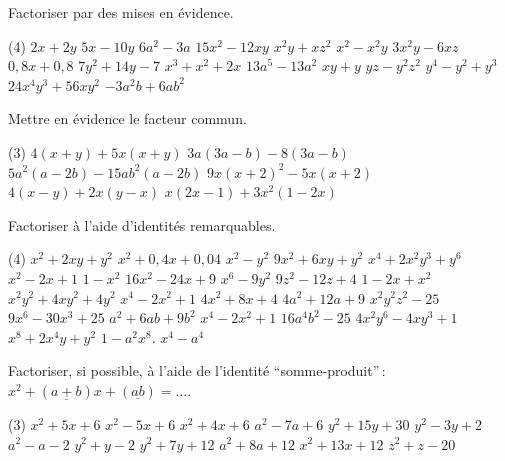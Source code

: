 \documentclass[a4paper,12pt]{report}
\begin{document}
\vspace*{-2\baselineskip}

\begin{acti}
Factoriser par des mises en évidence.
\begin{tasks}(4)
\task $2 x+2 y$
\task $5 x-10 y$
\task $6 a^2-3 a$
\task $15 x^2-12 x y$
\task $x^2 y+x z^2$
\task $x^2-x^2 y$
\task $3 x^2 y-6 x z$
\task $0,8 x+0,8$
\task $7 y^2+14 y-7$
\task $x^3+x^2+2 x$
\task $13 a^5-13 a^2$
\task $x y+y$
\task $y z-y^2 z^2$
\task $y^4-y^2+y^3$
\task $24 x^4 y^3+56 x y^2$
\task $-3 a^2 b+6 a b^2$
\end{tasks}
\end{acti}
\begin{acti}
Mettre en évidence le facteur commun.
\begin{tasks}(3)
\task $4(x+y)+5 x(x+y)$
\task $3 a(3 a-b)-8(3 a-b)$
\task $5 a^2(a-2 b)-15 a b^2(a-2 b)$
\task $9 x(x+2)^2-5 x(x+2)$
\task $4(x-y)+2 x(y-x)$
\task $x(2 x-1)+3 x^2(1-2 x)$
\end{tasks}
\end{acti}
\begin{acti}
Factoriser à l'aide d'identités remarquables.
	\begin{tasks}(4)
\task $x^2+2 x y+y^2$
\task $x^2+0,4 x+0,04$
\task $x^2-y^2$
\task $9 x^2+6 x y+y^2$
\task $x^4+2 x^2 y^3+y^6$
\task $x^2-2 x+1$
\task $1-x^2$
\task $16 x^2-24 x+9$
\task $x^6-9 y^2$
\task $9 z^2-12 z+4$
\task $1-2 x+x^2$
\task $x^2 y^2+4 x y^2+4 y^2$
\task $x^4-2 x^2+1$
\task $4 x^2+8 x+4$
\task $4 a^2+12 a+9$
\task $x^2 y^2 z^2-25$
\task $9 x^6-30 x^3+25$
\task $a^2+6 a b+9 b^2$
\task $x^4-2 x^2+1$
\task $16 a^4 b^2-25$
\task $4 x^2 y^6-4 x y^3+1$
\task $x^8+2 x^4 y+y^2$
\task $1-a^2 x^8$.
\task $x^4-a^4$
	\end{tasks}
\end{acti}
\begin{acti}
	Factoriser, si possible, à l'aide de l'identité \enquote{somme-produit}\,: $x^2+(\underline{a+b}) x+(\underline{a b})=\ldots$.
\begin{tasks}(3)
\task $x^2+5 x+6$
\task $x^2-5 x+6$
\task $x^2+4 x+6$
\task $a^2-7 a+6$
\task $y^2+15 y+30$
\task $y^2-3 y+2$
\task $a^2-a-2$
\task $y^2+y-2$
\task $y^2+7 y+12$
\task $a^2+8 a+12$
\task $x^2+13 x+12$
\task $z^2+z-20$
\end{tasks}	
\end{acti}
\end{document}
